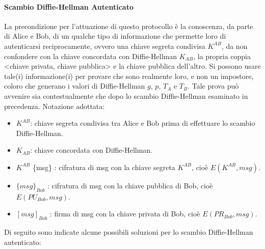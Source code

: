 \paragraph{Scambio Diffie-Hellman Autenticato}
La precondizione per l'attuazione di questo protocollo è la conoscenza, da parte di Alice e Bob, di un qualche tipo di informazione che permette loro di autenticarsi reciprocamente, ovvero una chiave segreta condivisa $K^{AB}$, da non confondere con la chiave concordata con Diffie-Hellman $K_{AB}$, la propria coppia <chiave privata, chiave pubblica> e la chiave
pubblica dell'altro. Si possono usare tale(i) informazione(i) per provare che sono realmente loro, e non un impostore, coloro che generano i valori di Diffie-Hellman $g$, $p$, $T_{A}$ e $T_{B}$. Tale prova può avvenire sia contestualmente che dopo lo scambio Diffie-Hellman esaminato in precedenza. 
\newline \newline
Notazione adottata: \begin{itemize}
\item $K^{AB}$: chiave segreta condivisa tra Alice e Bob prima di effettuare lo scambio Diffie-Hellman.
\item $K_{AB}$: chiave concordata con Diffie-Hellman.
\item $K^{AB}$ \{msg\} : cifratura di msg con la chiave segreta $K^{AB}$, cioè $E(K^{AB}, msg)$.
\item $\{msg\}_{Bob}$ : cifratura di msg con la chiave pubblica di Bob, cioè $E(PU_{Bob}, msg)$.
\item $[msg]_{Bob}$ : firma di msg con la chiave privata di Bob, cioè $E(PR_{Bob}, msg)$.
\end{itemize}
Di seguito sono indicate alcune possibili soluzioni per lo scambio Diffie-Hellman autenticato:
